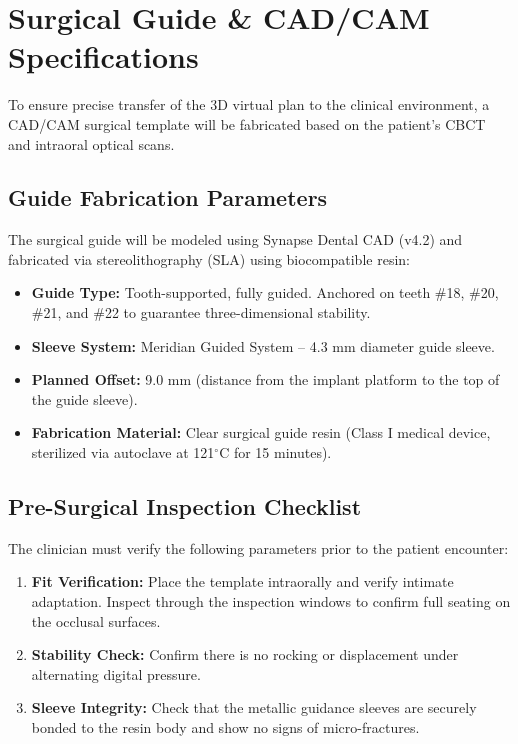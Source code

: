 \section{Surgical Guide \& CAD/CAM Specifications}

To ensure precise transfer of the 3D virtual plan to the clinical environment, a CAD/CAM surgical template will be fabricated based on the patient's CBCT and intraoral optical scans.

\subsection{Guide Fabrication Parameters}
The surgical guide will be modeled using Synapse Dental CAD (v4.2) and fabricated via stereolithography (SLA) using biocompatible resin:
\begin{itemize}
    \item \textbf{Guide Type:} Tooth-supported, fully guided. Anchored on teeth \#18, \#20, \#21, and \#22 to guarantee three-dimensional stability.
    \item \textbf{Sleeve System:} Meridian Guided System -- 4.3 mm diameter guide sleeve.
    \item \textbf{Planned Offset:} 9.0 mm (distance from the implant platform to the top of the guide sleeve).
    \item \textbf{Fabrication Material:} Clear surgical guide resin (Class I medical device, sterilized via autoclave at 121$^\circ$C for 15 minutes).
\end{itemize}

\subsection{Pre-Surgical Inspection Checklist}
The clinician must verify the following parameters prior to the patient encounter:
\begin{enumerate}
    \item \textbf{Fit Verification:} Place the template intraorally and verify intimate adaptation. Inspect through the inspection windows to confirm full seating on the occlusal surfaces.
    \item \textbf{Stability Check:} Confirm there is no rocking or displacement under alternating digital pressure.
    \item \textbf{Sleeve Integrity:} Check that the metallic guidance sleeves are securely bonded to the resin body and show no signs of micro-fractures.
\end{enumerate}

